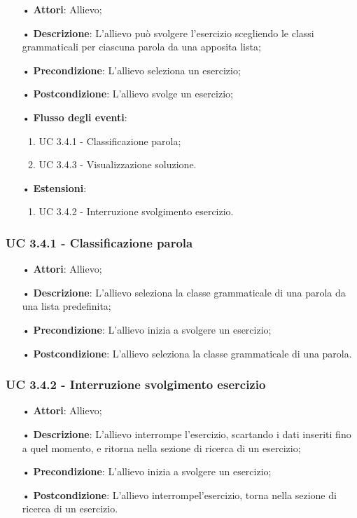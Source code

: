 \begin{itemize}
\item[•]\textbf{Attori}: Allievo;
\item[•]\textbf{Descrizione}: L'allievo può svolgere l'esercizio scegliendo le classi grammaticali per ciascuna parola da una apposita lista;
\item[•]\textbf{Precondizione}: L'allievo seleziona un esercizio;
\item[•]\textbf{Postcondizione}: L'allievo svolge un esercizio;
\item[•]\textbf{Flusso degli eventi}:
\begin{enumerate}
\item UC 3.4.1 - Classificazione parola;
\item UC 3.4.3 - Visualizzazione soluzione.  %
\end{enumerate}
\item[•]\textbf{Estensioni}:
\begin{enumerate}
\item UC 3.4.2 - Interruzione svolgimento esercizio.
\end{enumerate}
\end{itemize}

\subsubsection{UC 3.4.1 - Classificazione parola}
\begin{itemize}
\item[•]\textbf{Attori}: Allievo;
\item[•]\textbf{Descrizione}: L'allievo seleziona la classe grammaticale di una parola da una lista predefinita;
\item[•]\textbf{Precondizione}: L'allievo inizia a svolgere un esercizio;
\item[•]\textbf{Postcondizione}: L'allievo seleziona la classe grammaticale di una parola.
\end{itemize}

\subsubsection{UC 3.4.2 - Interruzione svolgimento esercizio}
\begin{itemize}
\item[•]\textbf{Attori}: Allievo;
\item[•]\textbf{Descrizione}: L'allievo interrompe  l'esercizio, scartando i dati inseriti fino a quel momento, e ritorna nella sezione di ricerca di un esercizio;
\item[•]\textbf{Precondizione}: L'allievo inizia a svolgere un esercizio;
\item[•]\textbf{Postcondizione}: L'allievo interrompel'esercizio, torna nella sezione di ricerca di un esercizio.
\end{itemize}

